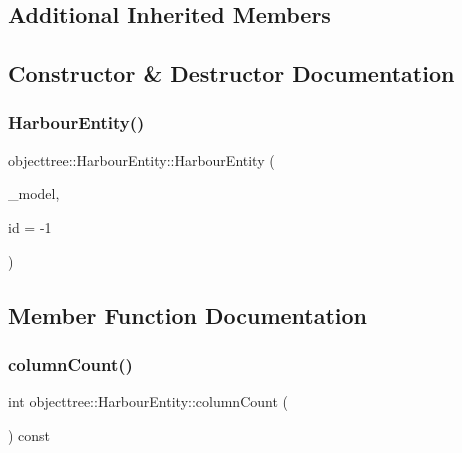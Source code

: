 \subsection*{Additional Inherited Members}


\subsection{Constructor \& Destructor Documentation}
\mbox{\label{classobjecttree_1_1_harbour_entity_ad4ce58a82a5112465ab462fe5fb436d2}} 
\subsubsection{\texorpdfstring{HarbourEntity()}{HarbourEntity()}}
{\footnotesize\ttfamily objecttree\+::\+Harbour\+Entity\+::\+Harbour\+Entity (\begin{DoxyParamCaption}\item[{\mbox{\hyperlink{class_object_tree_model}{Object\+Tree\+Model}} $\ast$}]{\+\_\+model,  }\item[{int}]{id = {\ttfamily -\/1} }\end{DoxyParamCaption})}



\subsection{Member Function Documentation}
\mbox{\label{classobjecttree_1_1_harbour_entity_a4b3230c7f686e812b961fdc5f5956925}} 
\subsubsection{\texorpdfstring{columnCount()}{columnCount()}}
{\footnotesize\ttfamily int objecttree\+::\+Harbour\+Entity\+::column\+Count (\begin{DoxyParamCaption}{ }\end{DoxyParamCaption}) const\hspace{0.3cm}{\ttfamily [virtual]}}



